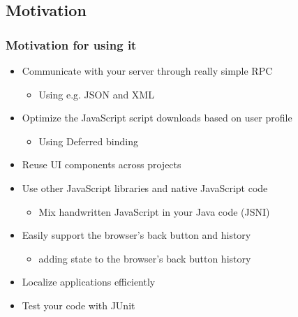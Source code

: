 \subsection{Motivation} %

\begin{frame}[red] %
\frametitle{Motivation for using it}

\begin{itemize}
\item Communicate with your server through really simple RPC
\begin{itemize}\item  Using e.g. JSON and XML\end{itemize}

\item Optimize the JavaScript script downloads based on user profile
\begin{itemize}\item  Using Deferred binding\end{itemize}

\item Reuse UI components across projects

\item Use other JavaScript libraries and native JavaScript code
\begin{itemize}\item  Mix handwritten JavaScript in your Java code (JSNI)\end{itemize}

\item Easily support the browser's back button and history
\begin{itemize}\item  adding state to the browser's back button history \end{itemize}

\item Localize applications efficiently

\item Test your code with JUnit

\end{itemize}

\end{frame}


